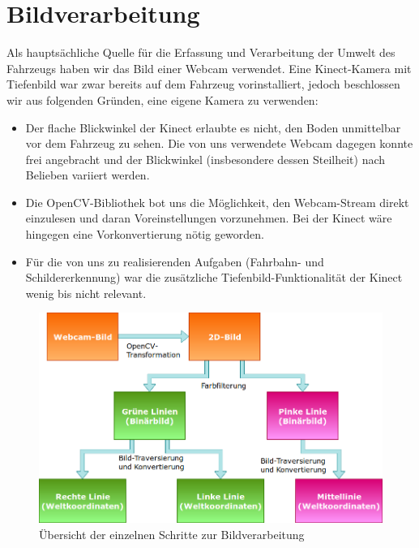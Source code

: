 \section{Bildverarbeitung}\label{sec:linien}

Als haupts\"achliche Quelle f\"ur die Erfassung und Verarbeitung der Umwelt des Fahrzeugs haben wir das Bild
einer Webcam verwendet. Eine Kinect-Kamera mit Tiefenbild war zwar bereits auf dem Fahrzeug vorinstalliert,
jedoch beschlossen wir aus folgenden Gr\"unden, eine eigene Kamera zu verwenden:
\begin{itemize}
	\item Der flache Blickwinkel der Kinect erlaubte es nicht, den Boden unmittelbar vor dem Fahrzeug
	zu sehen. Die von uns verwendete Webcam dagegen konnte frei angebracht und der Blickwinkel
	(insbesondere dessen Steilheit) nach Belieben variiert werden.
	\item Die OpenCV-Bibliothek bot uns die M\"oglichkeit, den Webcam-Stream direkt einzulesen und
	daran Voreinstellungen vorzunehmen. Bei der Kinect w\"are hingegen eine Vorkonvertierung n\"otig
	geworden.
	\item F\"ur die von uns zu realisierenden Aufgaben (Fahrbahn- und Schildererkennung) war die
	zus\"atzliche Tiefenbild-Funktionalit\"at der Kinect wenig bis nicht relevant.
\end{itemize}

\begin{figure}[h]
	\centering
	\includegraphics[width = 1.0\textwidth]{images/Bildverarbeitung.png}
	\caption{\"Ubersicht der einzelnen Schritte zur Bildverarbeitung}
	\label{fig:bildverarbeitung}
\end{figure}

